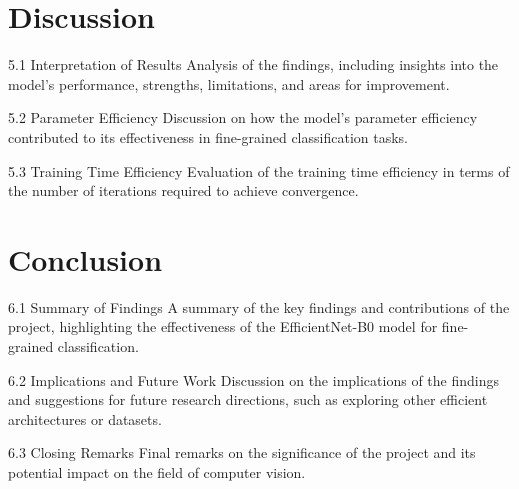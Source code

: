 \documentclass[12pt, a4paper, twoside]{article}
\begin{document}
	\section{Discussion}
		
		5.1 Interpretation of Results
		Analysis of the findings, including insights into the model's performance, strengths, limitations, and areas for improvement.
		
		5.2 Parameter Efficiency
		Discussion on how the model's parameter efficiency contributed to its effectiveness in fine-grained classification tasks.
		
		5.3 Training Time Efficiency
		Evaluation of the training time efficiency in terms of the number of iterations required to achieve convergence.
		
	\section{Conclusion}
		
		6.1 Summary of Findings
		A summary of the key findings and contributions of the project, highlighting the effectiveness of the EfficientNet-B0 model for fine-grained classification.
		
		6.2 Implications and Future Work
		Discussion on the implications of the findings and suggestions for future research directions, such as exploring other efficient architectures or datasets.
		
		6.3 Closing Remarks
		Final remarks on the significance of the project and its potential impact on the field of computer vision.
		

	
	
\end{document}
